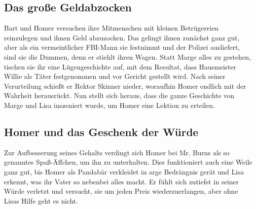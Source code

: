 
\subsection{Das große Geldabzocken}
Bart und Homer versuchen ihre Mitmenschen mit kleinen Betrügereien reinzulegen und ihnen Geld abzuzocken. Das gelingt ihnen zunächst ganz gut, aber als ein vermeintlicher FBI-Mann sie festnimmt und der Polizei ausliefert, sind sie die Dummen, denn er stiehlt ihren Wagen. Statt Marge alles zu gestehen, tischen sie ihr eine Lügengeschichte auf, mit dem Resultat, dass Hausmeister Willie als Täter festgenommen und vor Gericht gestellt wird. Nach seiner Verurteilung schießt er Rektor Skinner nieder, woraufhin Homer endlich mit der Wahrheit herausrückt. Nun stellt sich heraus, dass die ganze Geschichte von Marge und Lisa inszeniert wurde, um Homer eine Lektion zu erteilen.


\subsection{Homer und das Geschenk der Würde}\label{CABF04}
Zur Aufbesserung seines Gehalts verdingt sich Homer bei Mr. Burns als so genanntes \glqq Spaß-Äffchen\grqq , um ihn zu unterhalten. Dies funktioniert auch eine Weile ganz gut, bis Homer als Pandabär verkleidet in arge Bedrängnis gerät und Lisa erkennt, was ihr Vater so nebenbei alles macht. Er fühlt sich zutiefst in seiner Würde verletzt und versucht, sie um jeden Preis wiederzuerlangen, aber ohne Lisas Hilfe geht es nicht.

